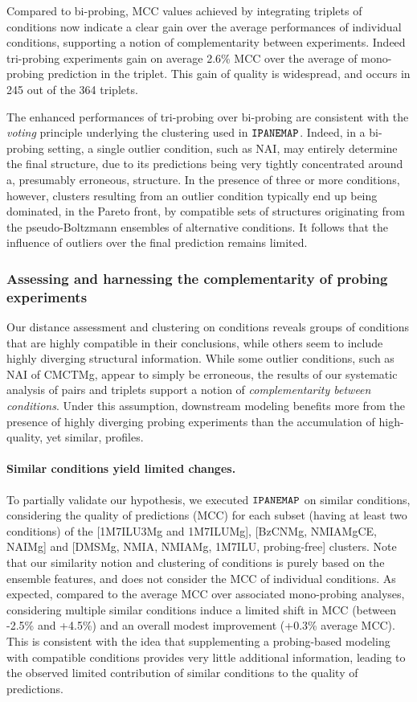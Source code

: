 \documentclass[a4,center,fleqn]{NAR}
\newcommand{\Software}[1]{$\text{\ttfamily #1}$}
\newcommand{\OurTool}{\Software{IPANEMAP}\xspace}
\newcommand{\Def}[1]{{\em #1}}
\begin{document}
Compared to bi-probing, MCC values achieved by integrating triplets of conditions now indicate a clear gain over the average performances of individual conditions, supporting a notion of complementarity between experiments. Indeed tri-probing experiments gain on average 2.6\% MCC over the average of mono-probing prediction in the triplet. This gain of quality is widespread, and occurs in 245 out of the 364 triplets. 

The enhanced performances of tri-probing over bi-probing are consistent with the \emph{voting} principle underlying the clustering used in \OurTool. Indeed, in a bi-probing setting, a single outlier condition, such as NAI, may entirely determine the final structure, due to its predictions being very tightly concentrated around a, presumably erroneous, structure. In the presence of three or more conditions, however, clusters resulting from an outlier condition typically end up being dominated, in the Pareto front, by compatible sets of structures originating from the pseudo-Boltzmann ensembles of alternative conditions. It follows that the influence of outliers over the final prediction remains limited.


\subsubsection{Assessing and harnessing the complementarity of probing experiments}
Our distance assessment and clustering on conditions reveals groups of conditions that are highly compatible in their conclusions, while others seem to include highly diverging structural information. While some outlier conditions, such as NAI of CMCTMg, appear to simply be erroneous, the results of our systematic analysis of pairs and triplets support a notion of \Def{complementarity between conditions}. Under this assumption, downstream modeling benefits more from the presence of highly diverging probing experiments than the accumulation of high-quality, yet similar, profiles.

\paragraph{Similar conditions yield limited changes.} To partially validate our hypothesis, we executed \OurTool{} on similar conditions, considering the quality of predictions (MCC) for each subset (having at least two conditions) of the [1M7ILU3Mg and 1M7ILUMg], [BzCNMg, NMIAMgCE, NAIMg] and [DMSMg, NMIA, NMIAMg, 1M7ILU, probing-free] clusters. Note that our similarity notion and clustering of conditions is purely based on the ensemble features, and does not consider the MCC of individual conditions.
As expected, compared to the average MCC over associated mono-probing analyses, 
considering multiple similar conditions induce a limited shift in MCC (between -2.5\% and +4.5\%) and an overall modest improvement (+0.3\% average MCC). This is consistent with the idea that supplementing a probing-based modeling with compatible conditions provides very little additional information, leading to the observed limited contribution of similar conditions to the quality of predictions.
\end{document}
